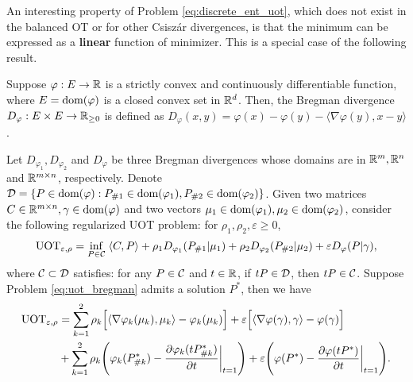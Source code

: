 An interesting property of Problem \eqref{eq:discrete_ent_uot}, which does not exist in the
balanced OT or for other Csiszár divergences,
is that the minimum can be expressed as a \textbf{linear} function of minimizer.
This is a special case of the following result.
\begin{definition}
  Suppose $\varphi: E \to \mathbb R$ is a strictly convex and continuously differentiable function,
  where $E = \text{dom}(\varphi)$ is a closed convex set in $\mathbb R^d$. Then,
  the Bregman divergence $D_{\varphi}: E \times E \to \mathbb R_{\geq 0}$ is defined as
  $D_{\varphi}(x, y) = \varphi(x) - \varphi(y) - \langle \nabla \varphi(y), x - y \rangle$.
\end{definition}
\begin{corollary}
  \label{prop:uot_minimizer}
  Let $D_{\varphi_1}, D_{\varphi_2}$ and $D_{\varphi}$ be three Bregman divergences whose
  domains are in $\mathbb R^m, \mathbb R^n$ and $\mathbb R^{m \times n}$, respectively. Denote
  $\mathcal D = \{P \in \text{dom}(\varphi): P_{\#1} \in \text{dom}(\varphi_1), P_{\#2} \in \text{dom}(\varphi_2) \}$.
  Given two matrices $C \in \mathbb R^{m \times n}, \gamma \in \text{dom}(\varphi)$ and
  two vectors $\mu_1 \in \text{dom}(\varphi_1), \mu_2 \in \text{dom}(\varphi_2)$,
  consider the following regularized UOT problem: for $\rho_1, \rho_2, \varepsilon \geq 0$,
  \begin{align}
    \label{eq:uot_bregman}
    \text{UOT}_{\varepsilon, \rho} = \inf_{P \in \mathcal C} \; \langle C, P \rangle
    + \rho_1 D_{\varphi_1}(P_{\# 1} | \mu_1) +
    \rho_2 D_{\varphi_2}(P_{\# 2} | \mu_2) + \varepsilon D_{\varphi}(P | \gamma),
  \end{align}
  where $\mathcal C \subset \mathcal D$ satisfies: for any $P \in \mathcal C$ and $t \in \mathbb R$,
  if $tP \in \mathcal D$, then $t P \in \mathcal C$. Suppose Problem \eqref{eq:uot_bregman}
  admits a solution $P^*$, then we have
  \begin{equation}
    \begin{split}
      \text{UOT}_{\varepsilon, \rho} &=
    \sum_{k=1}^2 \rho_k \Big[ \langle \nabla \varphi_k(\mu_k), \mu_k \rangle - \varphi_k(\mu_k) \Big]
    + \varepsilon \Big[ \langle \nabla \varphi(\gamma), \gamma \rangle - \varphi(\gamma) \Big] \\
    &+ \sum_{k=1}^2
    \rho_k \Bigg( \varphi_k(P^*_{\# k}) - \frac{\partial \varphi_k(tP^*_{\# k})}{\partial t} \bigg|_{t=1} \Bigg)
    + \varepsilon \Bigg( \varphi(P^*) - \frac{\partial \varphi(tP^*)}{\partial t} \bigg|_{t=1} \Bigg).
    \end{split}
  \end{equation}
\end{corollary}
